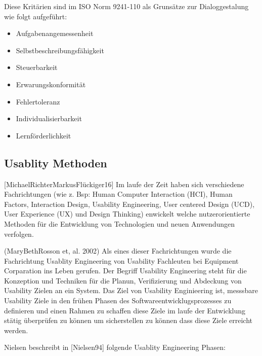 Diese Kritärien sind im  ISO Norm  9241-110 als Grunsätze zur Dialoggestalung wie folgt aufgeführt: %

\begin{itemize}
	\item Aufgabenangemessenheit
	\item Selbstbeschreibungsfähigkeit
	\item Steuerbarkeit
	\item Erwarungskonformität
	\item Fehlertoleranz
	\item Individualisierbarkeit
	\item Lernförderlichkeit
\end{itemize}

\subsection{Usablity Methoden}

[MichaelRichterMarkusFlückiger16]  Im laufe der Zeit haben sich verschiedene Fachrichtungen (wie z. Bsp: Human Computer Interaction (HCI), Human Factors, Interaction Design, Usability Engineering, 
User centered Design (UCD), User Experience (UX) und Design Thinking)  enwickelt welche nutzerorientierte Methoden für die Entwicklung von Technologien und neuen Anwendungen verfolgen. 

(MaryBethRosson et, al. 2002) Als eines dieser Fachrichtungen wurde die Fachrichtung Usablity Engineering von Usability Fachleuten bei Equipment Corparation 
ins Leben gerufen.  Der Begriff Usability Engineering steht für die Konzeption und Techniken für die Planun, Verifizierung und Abdeckung von Usability Zielen an ein System.  
Das Ziel von Usability Enginieering ist, messsbare Usability Ziele in den frühen Phasen des Softwareentwicklugsprozesses zu definieren und einen Rahmen zu schaffen diese 
Ziele im laufe der Entwicklung stätig überprüfen zu können um sicherstellen zu können dass diese Ziele erreicht werden.

Nielsen beschreibt in  [Nielsen94] folgende Usablity Engineering Phasen: 



